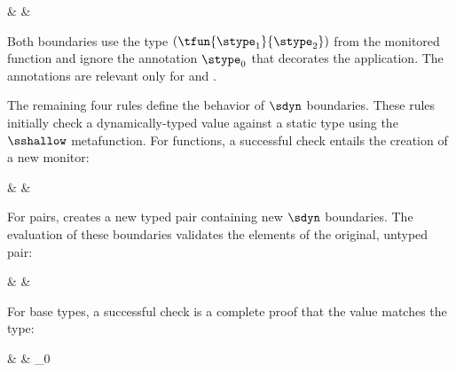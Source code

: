 \begin{inlinerrarray}
      &  \nredNS
      &  
      \\
\end{inlinerrarray}

\noindent
Both boundaries use the type $(\tfun{\stype_1}{\stype_2})$ from
the monitored function and ignore the annotation $\stype_0$ that decorates the application.
The annotations are relevant only for \Tname{} and \Aname{}.

The remaining four rules define the behavior of $\sdyn$ boundaries.
 These rules initially check a dynamically-typed value against a static type
 using the $\sshallow$ metafunction.
For functions, a successful check entails the creation of a new monitor:

\begin{inlinerrarray}
      &  \nredNS
      &  
      \\
\end{inlinerrarray}

\noindent
For pairs, \Nname{} creates a new typed pair containing new $\sdyn$ boundaries.
The evaluation of these boundaries validates the elements of the original,
 untyped pair:

\begin{inlinerrarray}
      &  \nredNS
      &  
\end{inlinerrarray}

\noindent For base types, a successful check is a complete proof that the
 value matches the type:

\begin{inlinerrarray}
      &  \nredNS
      &  \sint_0
      \\
\end{inlinerrarray}

